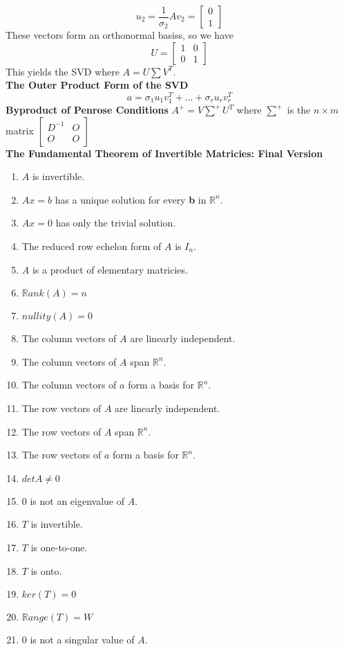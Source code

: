 $$u_2 = \frac{1}{\sigma_2}Av_2 = \begin{bmatrix}
    0\\1
\end{bmatrix}$$
These vectors form an orthonormal basiss, so we have $$U = \begin{bmatrix}
    1&0\\0&1
\end{bmatrix}$$
This yields the SVD where $A = U\sum V^T$.\\
\textbf{The Outer Product Form of the SVD}
$$a = \sigma_1 u_1v^T_1+\dots+\sigma_r u_rv^T_r$$
\textbf{Byproduct of Penrose Conditions}
$A^+ = V\sum^+U^T$ where $\sum^+$ is the $n\times m$ matrix $\begin{bmatrix}
    D^{-1}&O\\O&O
\end{bmatrix}$ \\
\textbf{The Fundamental Theorem of Invertible Matricies: Final Version}
\begin{enumerate}
    \item $A$ is invertible.
    \item $Ax = b$ has a unique solution for every \textbf{b} in $\mathbb{R}^n$.
    \item $Ax = 0$ has only the trivial solution.
    \item The reduced row echelon form of $A$ is $I_n$.
    \item $A$ is a product of elementary matricies.
    \item $\mathbb{R}ank(A) = n$
    \item $nullity(A) = 0$
    \item The column vectors of $A$ are linearly independent.
    \item The column vectors of $A$ span $\mathbb{R}^n$.
    \item The column vectors of $a$ form a basis for $\mathbb{R}^n$.
    \item The row vectors of $A$ are linearly independent.
    \item The row vectors of $A$ span $\mathbb{R}^n$.
    \item The row vectors of $a$ form a basis for $\mathbb{R}^n$.
    \item $det A \neq 0$
    \item $0$ is not an eigenvalue of $A$.
    \item $T$ is invertible.
    \item $T$ is one-to-one.
    \item $T$ is onto.
    \item $ker(T) = {0}$
    \item $\mathbb{R}ange(T) = W$
    \item $0$ is not a singular value of $A$.
\end{enumerate}

